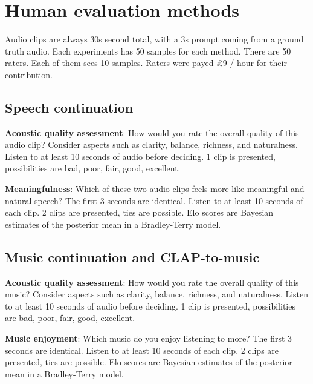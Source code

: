 \section{Human evaluation methods}
\label{sec:human_evals}
Audio clips are always 30s second total, with a 3s prompt coming from a ground truth audio. Each experiments has 50 samples for each method. There are 50 raters. Each of them sees 10 samples.
Raters were payed £9 / hour for their contribution.

\subsection{Speech continuation}
\textbf{Acoustic quality assessment}: How would you rate the overall quality of this audio clip? Consider aspects such as clarity, balance, richness, and naturalness. Listen to at least 10 seconds of audio before deciding.
1 clip is presented, possibilities are bad, poor, fair, good, excellent.

\textbf{Meaningfulness}: Which of these two audio clips feels more like meaningful and natural speech? The first 3 seconds are identical. Listen to at least 10 seconds of each clip.
2 clips are presented, ties are possible.
Elo scores are Bayesian estimates of the posterior mean in a Bradley-Terry model.


\subsection{Music continuation and CLAP-to-music}
\textbf{Acoustic quality assessment}: How would you rate the overall quality of this music? Consider aspects such as clarity, balance, richness, and naturalness. Listen to at least 10 seconds of audio before deciding.
1 clip is presented, possibilities are bad, poor, fair, good, excellent.

\textbf{Music enjoyment}: Which music do you enjoy listening to more? The first 3 seconds are identical. Listen to at least 10 seconds of each clip.
2 clips are presented, ties are possible.
Elo scores are Bayesian estimates of the posterior mean in a Bradley-Terry model.



